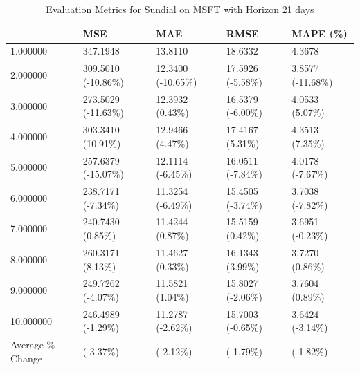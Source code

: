 \begin{table}
\caption{Evaluation Metrics for Sundial on MSFT with Horizon 21 days}
\label{tab:sundial_MSFT_h21_metrics}
\begin{tabular}{lllll}
\toprule
 & MSE & MAE & RMSE & MAPE (\%) \\
\midrule
1.000000 & 347.1948 & 13.8110 & 18.6332 & 4.3678 \\
2.000000 & 309.5010 (-10.86\%) & 12.3400 (-10.65\%) & 17.5926 (-5.58\%) & 3.8577 (-11.68\%) \\
3.000000 & 273.5029 (-11.63\%) & 12.3932 (0.43\%) & 16.5379 (-6.00\%) & 4.0533 (5.07\%) \\
4.000000 & 303.3410 (10.91\%) & 12.9466 (4.47\%) & 17.4167 (5.31\%) & 4.3513 (7.35\%) \\
5.000000 & 257.6379 (-15.07\%) & 12.1114 (-6.45\%) & 16.0511 (-7.84\%) & 4.0178 (-7.67\%) \\
6.000000 & 238.7171 (-7.34\%) & 11.3254 (-6.49\%) & 15.4505 (-3.74\%) & 3.7038 (-7.82\%) \\
7.000000 & 240.7430 (0.85\%) & 11.4244 (0.87\%) & 15.5159 (0.42\%) & 3.6951 (-0.23\%) \\
8.000000 & 260.3171 (8.13\%) & 11.4627 (0.33\%) & 16.1343 (3.99\%) & 3.7270 (0.86\%) \\
9.000000 & 249.7262 (-4.07\%) & 11.5821 (1.04\%) & 15.8027 (-2.06\%) & 3.7604 (0.89\%) \\
10.000000 & 246.4989 (-1.29\%) & 11.2787 (-2.62\%) & 15.7003 (-0.65\%) & 3.6424 (-3.14\%) \\
Average \% Change & (-3.37\%) & (-2.12\%) & (-1.79\%) & (-1.82\%) \\
\bottomrule
\end{tabular}
\end{table}
